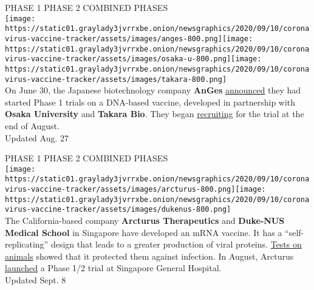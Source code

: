 PHASE 1 PHASE 2 COMBINED PHASES\\
\texttt{[image: https://static01.graylady3jvrrxbe.onion/newsgraphics/2020/09/10/coronavirus-vaccine-tracker/assets/images/anges-800.png]}\texttt{[image: https://static01.graylady3jvrrxbe.onion/newsgraphics/2020/09/10/coronavirus-vaccine-tracker/assets/images/osaka-u-800.png]}\texttt{[image: https://static01.graylady3jvrrxbe.onion/newsgraphics/2020/09/10/coronavirus-vaccine-tracker/assets/images/takara-800.png]}\\
On June 30, the Japanese biotechnology company \textbf{\textbf{AnGes}}
\href{https://www.japantimes.co.jp/news/2020/06/30/national/science-health/japan-first-coronavirus-vaccine-clinical-test-starts/}{announced}
they had started Phase 1 trials on a DNA-based vaccine, developed in
partnership with \textbf{\textbf{Osaka University}} and
\textbf{\textbf{Takara Bio}}. They began
\href{https://clinicaltrials.gov/ct2/show/NCT04527081?term=vaccine\&recrs=adf\&cond=COVID-19\&phase=0123\&sort=nwst\&draw=2\&rank=1}{recruiting}
for the trial at the end of August.\\
Updated Aug. 27

PHASE 1 PHASE 2 COMBINED PHASES\\
\texttt{[image: https://static01.graylady3jvrrxbe.onion/newsgraphics/2020/09/10/coronavirus-vaccine-tracker/assets/images/arcturus-800.png]}\texttt{[image: https://static01.graylady3jvrrxbe.onion/newsgraphics/2020/09/10/coronavirus-vaccine-tracker/assets/images/dukenus-800.png]}\\
The California-based company \textbf{\textbf{Arcturus Therapeutics}} and
\textbf{\textbf{Duke-NUS Medical School}} in Singapore have developed an
mRNA vaccine. It has a ``self-replicating'' design that leads to a
greater production of viral proteins.
\href{https://www.biorxiv.org/content/10.1101/2020.09.03.280446v1}{Tests
on animals} showed that it protected them against infection. In August,
Arcturus
\href{https://ir.arcturusrx.com/news-releases/news-release-details/arcturus-therapeutics-announces-it-has-initiated-dosing-its}{launched}
a Phase 1/2 trial at Singapore General Hospital.\\
Updated Sept. 8

